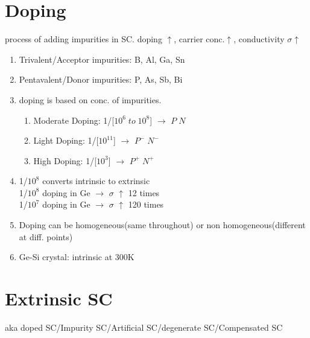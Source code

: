 \documentclass[10pt, a4paper]{report}
\begin{document}
	\section{Doping}
	process of adding impurities in SC. doping $\uparrow$, carrier conc.$\uparrow$, conductivity $\sigma$$\uparrow$
	\begin{enumerate}
		\item Trivalent/Acceptor impurities: B, Al, Ga, Sn
		\item Pentavalent/Donor impurities: P, As, Sb, Bi
		\item doping is based on conc. of impurities.
		\begin{enumerate}
			\item Moderate Doping: 1/[$ 10^6 \; to\; 10^8 $] $\rightarrow$ $ P\; N $
			\item Light Doping: 1/[$ 10^{11}$] $\rightarrow$ $ P^-\; N^- $
			\item High Doping: 1/[$ 10^3 $] $\rightarrow$ $ P^+\; N^+ $
		\end{enumerate}
		\item 1/$ 10^8 $ converts intrinsic to extrinsic \\
		1/$ 10^8 $ doping in Ge $\rightarrow$ $\sigma$ $\uparrow$ 12 times \\
		1/$ 10^7 $ doping in Ge $\rightarrow$ $\sigma$ $\uparrow$ 120 times
		\item Doping can be homogeneous(same throughout) or non homogeneous(different at diff. points)
		\item Ge-Si crystal: intrinsic at 300K
	\end{enumerate}
	\section{Extrinsic SC}
	aka doped SC/Impurity SC/Artificial SC/degenerate SC/Compensated SC \\
\end{document}
